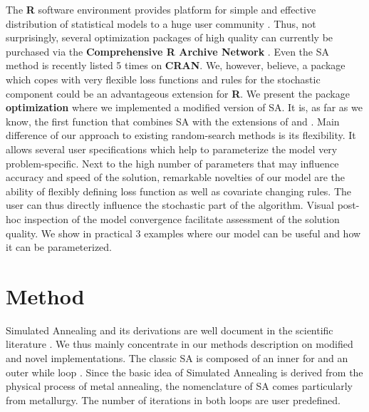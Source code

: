 The \textbf{R} software environment provides platform for simple and effective distribution of statistical models to a huge user community \citep{xiang_2013}. Thus, not surprisingly, several optimization packages of high quality can currently be purchased via the \textbf{Comprehensive R Archive Network} \citep{theussl_2016}. Even the SA method is recently listed 5 times on \textbf{CRAN}. We, however, believe, a package which copes with very flexible loss functions and rules for the stochastic component could be an advantageous extension for \textbf{R}. We present the package \textbf{optimization} where we implemented a modified version of SA. It is, as far as we know, the first function that combines SA with the extensions of \citet{corana_1987} and \citet{pronzato_1984}. Main difference of our approach to existing random-search methods is its flexibility. It allows several user specifications which help to parameterize the model very problem-specific. Next to the high number of parameters that may influence accuracy and speed of the solution, remarkable novelties of our model are the ability of flexibly defining loss function as well as covariate changing rules. The user can thus directly influence the stochastic part of the algorithm. Visual post-hoc inspection of the model convergence facilitate assessment of the solution quality. We show in practical 3 examples where our model can be useful and how it can be parameterized.\\

\section{Method}
Simulated Annealing and its derivations are well document in the scientific literature \citep[e. g. in][]{hansen_2012,kirkpatrick_1983, xiang_2013}. We thus mainly concentrate in our methods description on modified and novel implementations. The classic SA is composed of an inner for and an outer while loop \citep{kirkpatrick_1983}. Since the basic idea of Simulated Annealing is derived from the physical process of metal annealing, the nomenclature of SA comes particularly from metallurgy. The number of iterations in both loops are user predefined.\\

